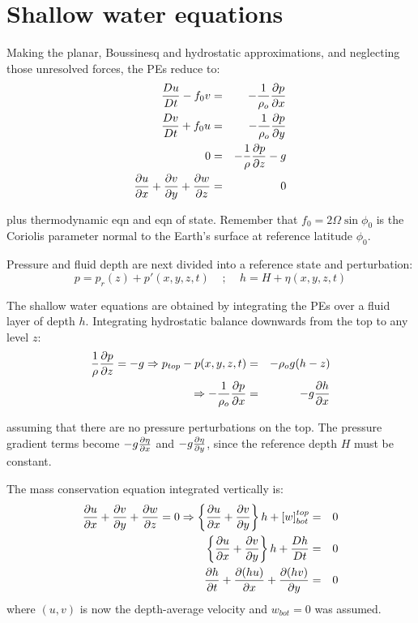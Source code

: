 \section{Shallow water equations}

Making the planar, Boussinesq and hydrostatic approximations, and neglecting those unresolved forces, 
the PEs reduce to:
\begin{eqnarray}
	\frac{D u}{D t}-f_0 v & = & -\frac{1}{\rho_o}\frac{\partial p}{\partial x} \\
	\frac{D v}{D t}+f_0 u & = & -\frac{1}{\rho_o}\frac{\partial p}{\partial y} \\
	0 & = & - \frac{1}{\rho} \frac{\partial p}{\partial z} - g \\
	\frac{\partial u}{\partial x}+\frac{\partial v}{\partial y}+\frac{\partial w}{\partial z} & = & 0
\end{eqnarray}

plus thermodynamic eqn and eqn of state. Remember that $f_0=2\Omega \sin\phi_0$ is the Coriolis parameter normal to the Earth's surface at
reference latitude $\phi_0$.

Pressure and fluid depth are next divided into
a reference state and perturbation:
\begin{equation*}
	p=p_r(z)+p'(x,y,z,t)~~~~~;~~~~~h=H+\eta(x,y,z,t)
\end{equation*}

The shallow water equations are obtained by integrating the PEs
over a fluid layer of depth $h$. Integrating hydrostatic balance
downwards from the top to any level $z$:
\begin{eqnarray*}
	\frac{1}{\rho}\frac{\partial p}{\partial z}=-g \Rightarrow p_{top}-p(x,y,z,t) & = & -\rho_o g (h-z) \\
	\Rightarrow -\frac{1}{\rho_o} \frac{\partial p}{\partial x} & = & -g \frac{\partial h}{\partial x}
\end{eqnarray*}

assuming that there are no pressure perturbations on the top.
The pressure gradient terms become $-g\frac{\partial \eta}{\partial x}$ and
$-g\frac{\partial \eta}{\partial y}$, since the reference depth $H$ must be constant.

The mass conservation equation integrated vertically is:
\begin{eqnarray*}
	\frac{\partial u}{\partial x}+\frac{\partial v}{\partial y}+\frac{\partial w}{\partial z} = 0 \Rightarrow \left\{ \frac{\partial u}{\partial x}+\frac{\partial v}{\partial y} \right\} h+[w]^{top}_{bot} & = & 0 \\
	\left\{ \frac{\partial u}{\partial x}+\frac{\partial v}{\partial y} \right\} h+\frac{D h}{D t} & = & 0 \\
	\frac{\partial h}{\partial t}+\frac{\partial (hu)}{\partial x}+\frac{\partial (hv)}{\partial y} & = & 0
\end{eqnarray*}
where $(u,v)$ is now the depth-average velocity and $w_{bot}=0$ was assumed. 


